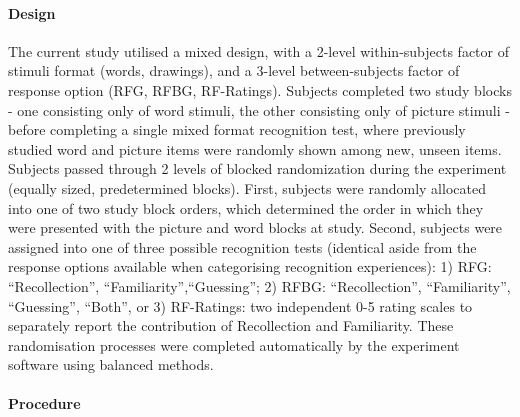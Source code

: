 \documentclass[
  11pt,
]{article}
\begin{document}
\hypertarget{design}{%
\paragraph{Design}\label{design}}

The current study utilised a mixed design, with a 2-level
within-subjects factor of stimuli format (words, drawings), and a
3-level between-subjects factor of response option (RFG, RFBG,
RF-Ratings). Subjects completed two study blocks - one consisting only
of word stimuli, the other consisting only of picture stimuli - before
completing a single mixed format recognition test, where previously
studied word and picture items were randomly shown among new, unseen
items. Subjects passed through 2 levels of blocked randomization during
the experiment (equally sized, predetermined blocks). First, subjects
were randomly allocated into one of two study block orders, which
determined the order in which they were presented with the picture and
word blocks at study. Second, subjects were assigned into one of three
possible recognition tests (identical aside from the response options
available when categorising recognition experiences): 1) RFG:
``Recollection'', ``Familiarity'',``Guessing''; 2) RFBG:
``Recollection'', ``Familiarity'', ``Guessing'', ``Both'', or 3)
RF-Ratings: two independent 0-5 rating scales to separately report the
contribution of Recollection and Familiarity. These randomisation
processes were completed automatically by the experiment software using
balanced methods.

\hypertarget{procedure}{%
\paragraph{Procedure}\label{procedure}}
\end{document}
